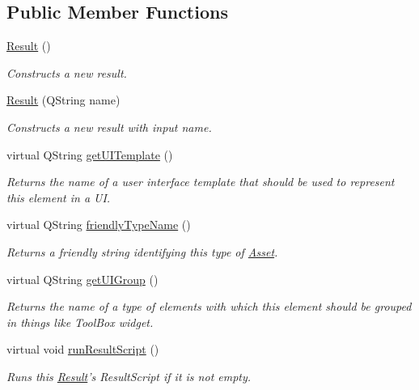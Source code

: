 \subsection*{Public Member Functions}
\begin{DoxyCompactItemize}
\item 
\hyperlink{class_picto_1_1_result_a18fd5df5e2e98295ddf4d6f778fc8761}{Result} ()
\begin{DoxyCompactList}\small\item\em Constructs a new result. \end{DoxyCompactList}\item 
\hyperlink{class_picto_1_1_result_a3880bfb5af8bdb550d47c1824dbed1f1}{Result} (Q\-String name)
\begin{DoxyCompactList}\small\item\em Constructs a new result with input name. \end{DoxyCompactList}\item 
\hypertarget{class_picto_1_1_result_a8ab0583551a4e9405eaf5f77c4a4adf9}{virtual Q\-String \hyperlink{class_picto_1_1_result_a8ab0583551a4e9405eaf5f77c4a4adf9}{get\-U\-I\-Template} ()}\label{class_picto_1_1_result_a8ab0583551a4e9405eaf5f77c4a4adf9}

\begin{DoxyCompactList}\small\item\em Returns the name of a user interface template that should be used to represent this element in a U\-I. \end{DoxyCompactList}\item 
virtual Q\-String \hyperlink{class_picto_1_1_result_a908f8f41cb0c4fc7ffa92ae1c0a77781}{friendly\-Type\-Name} ()
\begin{DoxyCompactList}\small\item\em Returns a friendly string identifying this type of \hyperlink{class_picto_1_1_asset}{Asset}. \end{DoxyCompactList}\item 
\hypertarget{class_picto_1_1_result_ab4cc8dfac5b3c92266265060366ad0d4}{virtual Q\-String \hyperlink{class_picto_1_1_result_ab4cc8dfac5b3c92266265060366ad0d4}{get\-U\-I\-Group} ()}\label{class_picto_1_1_result_ab4cc8dfac5b3c92266265060366ad0d4}

\begin{DoxyCompactList}\small\item\em Returns the name of a type of elements with which this element should be grouped in things like Tool\-Box widget. \end{DoxyCompactList}\item 
\hypertarget{class_picto_1_1_result_aa9a0df0a918461487e008136a5a84aa1}{virtual void \hyperlink{class_picto_1_1_result_aa9a0df0a918461487e008136a5a84aa1}{run\-Result\-Script} ()}\label{class_picto_1_1_result_aa9a0df0a918461487e008136a5a84aa1}

\begin{DoxyCompactList}\small\item\em Runs this \hyperlink{class_picto_1_1_result}{Result}'s Result\-Script if it is not empty. \end{DoxyCompactList}\end{DoxyCompactItemize}
